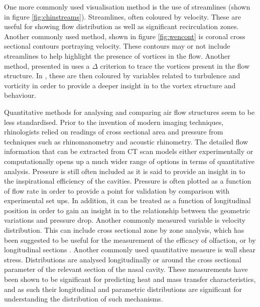 One more commonly used visualisation method is the use of streamlines (shown in figure \ref{fig:chinstreams}). Streamlines, often coloured by velocity\cite{Wen2008, Zhu2011, Garcia2007}. These are useful for showing flow distribution as well as significant recirculation zones\cite{Lintermann2013, Xi2014}. Another commonly used method, shown in figure \ref{fig:wencont} is coronal cross sectional contours portraying velocity. These contours may or not include streamlines to help highlight the presence of vortices in the flow\cite{Wen2008}. Another method, presented in \cite{Lintermann2013} uses a $\Delta$ criterion to trace the vortices present in the flow structure. In \cite{Lintermann2013}, these are then coloured by variables related to turbulence and vorticity in order to provide a deeper insight in to the vortex structure and behaviour.

Quantitative methods for analysing and comparing air flow structures seem to be less standardised. Prior to the invention of modern imaging techniques, rhinologists relied on readings of cross sectional area and pressure from techniques such as rhinomanometry and acoustic rhinometry\cite{Doorly2008c}. The detailed flow information that can be extracted from CT scan models either experimentally or computationally opens up a much wider range of options in terms of quantitative analysis. Pressure is still often included as it is said to provide an insight in to the inspirational efficiency of the cavities\cite{Lintermann2013}. Pressure is often plotted as a function of flow rate in order to provide a point for validation by comparison with experimental set ups\cite{Wen2008, Inthavong2014}. In addition, it can be treated as a function of longitudinal position in order to gain an insight in to the relationship between the geometric variations and pressure drop\cite{Lintermann2013}. Another commonly measured variable is velocity distribution\cite{Keyhani1995, Zhu2011, Lintermann2013}. This can include cross sectional zone by zone analysis\cite{Keyhani1995, Zhu2011}, which has been suggested to be useful for the measurement of the efficacy of olfaction\cite{Zhu2011}, or by longitudinal sections\cite{Lintermann2013,Taylor2010} . Another commonly used quantitative measure is wall shear stress. Distributions are analysed longitudinally\cite{Wen2008} or around the cross sectional parameter of the relevant section of the nasal cavity\cite{Burgos2014}. These measurements have been shown to be significant for predicting heat and mass transfer characteristics\cite{Taylor2010}, and as such their longitudinal and parametric distributions are significant for understanding the distribution of such mechanisms.

